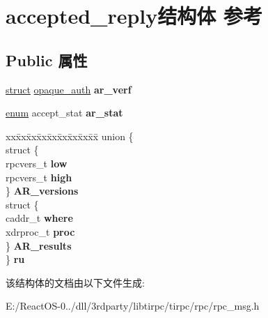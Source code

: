 \hypertarget{structaccepted__reply}{}\section{accepted\+\_\+reply结构体 参考}
\label{structaccepted__reply}
\subsection*{Public 属性}
\begin{DoxyCompactItemize}
\item 
\mbox{\label{structaccepted__reply_a9d88f35624b6b212e44f3b4b6bc0f041}} 
\hyperlink{interfacestruct}{struct} \hyperlink{structopaque__auth}{opaque\+\_\+auth} {\bfseries ar\+\_\+verf}
\item 
\mbox{\label{structaccepted__reply_abfb18b2cafbed7615c8c09c9c2b3b566}} 
\hyperlink{interfaceenum}{enum} accept\+\_\+stat {\bfseries ar\+\_\+stat}
\item 
\mbox{\label{structaccepted__reply_a7b2162e86f6e0f2f0615d4b05617821a}} 
\begin{tabbing}
xx\=xx\=xx\=xx\=xx\=xx\=xx\=xx\=xx\=\kill
union \{\\
\>struct \{\\
\>\>rpcvers\_t {\bfseries low}\\
\>\>rpcvers\_t {\bfseries high}\\
\>\} {\bfseries AR\_versions}\\
\>struct \{\\
\>\>caddr\_t {\bfseries where}\\
\>\>xdrproc\_t {\bfseries proc}\\
\>\} {\bfseries AR\_results}\\
\} {\bfseries ru}\\

\end{tabbing}\end{DoxyCompactItemize}


该结构体的文档由以下文件生成\+:\begin{DoxyCompactItemize}
\item 
E\+:/\+React\+O\+S-\/0../dll/3rdparty/libtirpc/tirpc/rpc/rpc\+\_\+msg.\+h\end{DoxyCompactItemize}
